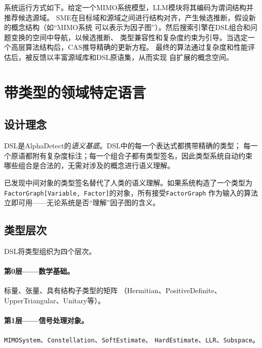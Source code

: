 \documentclass[12pt,a4paper]{article}
\begin{document}
系统运行方式如下。给定一个MIMO系统模型，LLM模块将其编码为谓词结构并推荐候选源域。
SME在目标域和源域之间进行结构对齐，产生候选推断，假设新的概念结构（如``MIMO系统
可以表示为因子图''）。然后搜索引擎在DSL组合和问题变换的空间中导航，以候选推断、
类型兼容性和复杂度约束为引导。当选定一个高层算法结构后，CAS推导精确的更新方程。
最终的算法通过复杂度和性能评估后，被反馈以丰富源域库和DSL原语集，从而实现
自扩展的概念空间。

\section{带类型的领域特定语言}
\label{sec:dsl}

\subsection{设计理念}

DSL是AlphaDetect的\emph{语义基底}。DSL中的每一个表达式都携带精确的类型；
每一个原语都附有复杂度标注；每一个组合子都有类型签名，因此类型系统自动约束
哪些组合是合法的，无需对涉及的概念进行语义理解。

\begin{tcolorbox}[insight]
  已发现中间对象的类型签名替代了人类的语义理解。如果系统构造了一个类型为
  \texttt{FactorGraph[Variable, Factor]}的对象，所有接受\texttt{FactorGraph}
  作为输入的算法立即可用——无论系统是否``理解''因子图的含义。
\end{tcolorbox}

\subsection{类型层次}

DSL将类型组织为四个层次。

\paragraph{第0层——数学基础。}
标量、张量、具有结构子类型的矩阵
（Hermitian、PositiveDefinite、UpperTriangular、Unitary等）。

\paragraph{第1层——信号处理对象。}
\texttt{MIMOSystem}、\texttt{Constellation}、\texttt{SoftEstimate}、
\texttt{HardEstimate}、\texttt{LLR}、\texttt{Subspace}。
\end{document}
